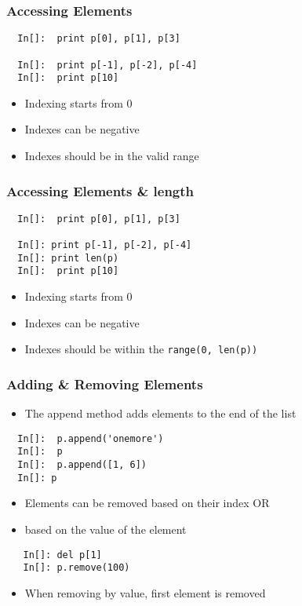 \begin{frame}[fragile]
  \frametitle{Accessing Elements}
  \begin{lstlisting}
  In[]:  print p[0], p[1], p[3]

  In[]:  print p[-1], p[-2], p[-4]
  In[]:  print p[10]
  \end{lstlisting}
  \begin{itemize}
  \item Indexing starts from 0
  \item Indexes can be negative
  \item Indexes should be in the valid range
  \end{itemize}
\end{frame}

\begin{frame}[fragile]
  \frametitle{Accessing Elements \& length}
  \begin{lstlisting}
  In[]:  print p[0], p[1], p[3]

  In[]: print p[-1], p[-2], p[-4]
  In[]: print len(p)
  In[]:  print p[10]
  \end{lstlisting}
  \begin{itemize}
  \item Indexing starts from 0
  \item Indexes can be negative
  \item Indexes should be within the \texttt{range(0, len(p))}
  \end{itemize}
\end{frame}


\begin{frame}[fragile]
  \frametitle{Adding \& Removing Elements}
  \begin{itemize}
  \item The append method adds elements to the end of the list
  \end{itemize}
  \begin{lstlisting}
  In[]:  p.append('onemore')
  In[]:  p
  In[]:  p.append([1, 6])
  In[]: p
  \end{lstlisting}
  \begin{itemize}
  \item Elements can be removed based on their index OR
  \item based on the value of the element
  \end{itemize}
  \begin{lstlisting}
   In[]: del p[1]
   In[]: p.remove(100)
  \end{lstlisting}
  \begin{itemize}
  \item \alert{When removing by value, first element is removed}
  \end{itemize}
\end{frame}


